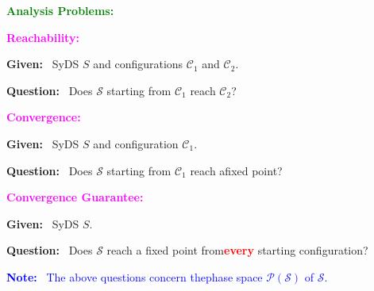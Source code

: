 \documentclass[landscape,a0paper,fontscale=0.285]{baposter} %
\newcommand{\cals}{\mbox{$\mathcal{S}$}}
\newcommand{\calco}{\mbox{$\mathcal{C}_1$}}
\newcommand{\calct}{\mbox{$\mathcal{C}_2$}}
\newcommand{\calp}{\mbox{$\mathcal{P}$}}
\begin{document}
\begin{poster}
{{\begin{itemize}[leftmargin=*,noitemsep,topsep=0pt]
\end{itemize}
}
\textcolor{green}{\textbf{Analysis Problems:}}

\smallskip

\textcolor{magenta}{\textbf{Reachability:}} \smallskip

\noindent
\textbf{Given:}~ SyDS $S$ and
configurations \calco{} and \calct.  %

\textbf{Question:}~ Does \cals{} starting from \calco{} 
reach \calct?

\smallskip

\textcolor{magenta}{\textbf{Convergence:}} \smallskip

\noindent
\textbf{Given:}~ SyDS $S$ and
configuration \calco. %

\noindent
\textbf{Question:}~ Does \cals{} starting from \calco{} 
reach a\newline fixed point?

\smallskip

\textcolor{magenta}{\textbf{Convergence Guarantee:}} \smallskip

\noindent
\textbf{Given:}~ SyDS $S$.  %

\textbf{Question:}~ Does \cals{} reach a fixed point
from\newline \textcolor{red}{\textbf{every}} starting configuration?

\smallskip

\textcolor{blue}{\textbf{Note:}~ The above questions concern
the\newline phase space $\calp(\cals)$ of \cals.}
}


\end{poster}
\end{document}
